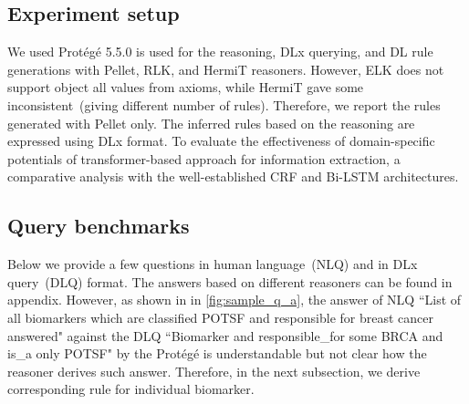 \subsection{Experiment setup}
We used Prot{\'e}g{\'e} 5.5.0 is used for the reasoning, DLx querying, and DL rule generations with Pellet, RLK, and HermiT reasoners. 
However, ELK does not support object all values from axioms, while HermiT gave some inconsistent~(giving different number of rules). Therefore, we report the rules generated with Pellet only. The inferred rules based on the reasoning are expressed using DLx format. To evaluate the effectiveness of domain-specific potentials of transformer-based approach for information extraction, a comparative analysis with the well-established CRF and Bi-LSTM architectures. 

\subsection{Query benchmarks}
Below we provide a few questions in human language~(NLQ) and in DLx query~(DLQ) format. The answers based on different reasoners can be found in appendix. However, as shown in in \cref{fig:sample_q_a}, the answer of NLQ ``List of all biomarkers which are classified POTSF and responsible for breast cancer answered" against the DLQ ``Biomarker and responsible\_for some BRCA and is\_a only POTSF" by the Prot{\'e}g{\'e} is understandable but not clear how the reasoner derives such answer. Therefore, in the next subsection, we derive corresponding rule for individual biomarker. 

